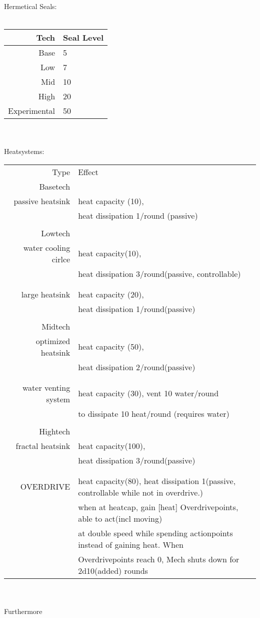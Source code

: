 \documentclass{article}
\begin{document}
Hermetical Seals:\\\\
\begin{tabular}{r|l}
Tech & Seal Level \\\hline
Base &  5\\
Low &   7\\
Mid &   10\\
High &  20\\
Experimental & 50\\
\end{tabular}\\\\
Heatsystems:\\
\begin{tabular}{r|l}
Type & Effect \\
Basetech\\\hline
passive heatsink &  heat capacity (10), \\&heat dissipation 1/round (passive)\\
\\Lowtech\\\hline
water cooling cirlce & heat capacity(10), \\&heat dissipation 3/round(passive, controllable)\\
\\&\\large heatsink & heat capacity (20), \\&heat dissipation 1/round(passive)\\
\\Midtech\\\hline
optimized heatsink & heat capacity (50),\\& heat dissipation 2/round(passive)\\
\\&\\water venting system & heat capacity (30), vent 10 water/round\\& to dissipate 10 heat/round (requires water)\\
\\Hightech\\\hline
fractal heatsink & heat capacity(100),\\& heat dissipation 3/round(passive)\\
\\&\\OVERDRIVE & heat capacity(80), heat dissipation 1(passive, controllable while not in overdrive.)
                \\& when at heatcap, gain [heat] Overdrivepoints, able to act(incl moving) \\&
                at double speed while spending actionpoints instead of gaining heat. When \\&
                 Overdrivepoints reach 0, Mech shuts down for 2d10(added) rounds\\
\end{tabular}\\\\Furthermore
\end{document}
